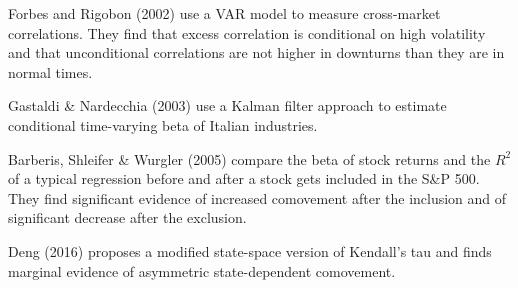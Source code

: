 Forbes and Rigobon (2002) use a VAR model to measure cross-market correlations. They find that excess correlation is conditional on high volatility and that unconditional correlations are not higher in downturns than they are in normal times.

Gastaldi \& Nardecchia (2003) use a Kalman filter approach to estimate conditional time-varying beta of Italian industries.

Barberis, Shleifer \& Wurgler (2005) compare the beta of stock returns and the $R^2$ of a typical regression before and after a stock gets included in the S\&P 500. They find significant evidence of increased comovement after the inclusion and of significant decrease after the exclusion.

Deng (2016) proposes a modified state-space version of Kendall's tau and finds marginal evidence of asymmetric state-dependent comovement.
